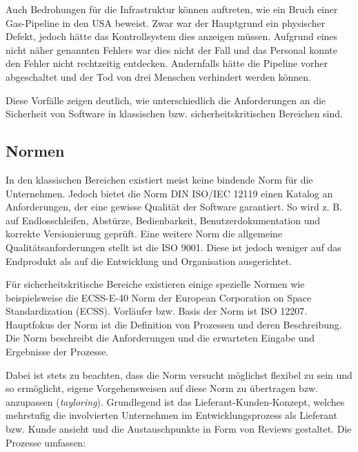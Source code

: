 Auch Bedrohungen für die Infrastruktur können auftreten, wie ein Bruch einer Gas-Pipeline in den USA beweist.
Zwar war der Hauptgrund ein physischer Defekt, jedoch hätte das Kontrollsystem dies anzeigen müssen.
Aufgrund eines nicht näher genannten Fehlers war dies nicht der Fall und das Personal konnte den Fehler nicht rechtzeitig entdecken.
Andernfalls hätte die Pipeline vorher abgeschaltet und der Tod von drei Menschen verhindert werden können.

Diese Vorfälle zeigen deutlich, wie unterschiedlich die Anforderungen an die Sicherheit von Software in klassischen bzw. sicherheitskritischen Bereichen sind.

\subsection{Normen} %

In den klassischen Bereichen existiert meist keine bindende Norm für die Unternehmen.
Jedoch bietet die Norm DIN ISO/IEC 12119 einen Katalog an Anforderungen, der eine gewisse Qualität der Software garantiert.
So wird z. B. auf Endlosschleifen, Abstürze, Bedienbarkeit, Benutzerdokumentation und korrekte Versionierung geprüft. 
Eine weitere Norm die allgemeine Qualitätsanforderungen stellt ist die ISO 9001.
Diese ist jedoch weniger auf das Endprodukt als auf die Entwicklung und Organisation ausgerichtet.
\parencite[Vgl.][S. 66 - 67]{Hohler:1998aa}


Für sicherheitskritische Bereiche existieren einige spezielle Normen wie beispielsweise die ECSS-E-40 Norm der European Corporation on Space Standardization (ECSS).
Vorläufer bzw. Basis der Norm ist ISO 12207.
Hauptfokus der Norm ist die Definition von Prozessen und deren Beschreibung. 
Die Norm beschreibt die Anforderungen und die erwarteten Eingabe und Ergebnisse der Prozesse.

Dabei ist stets zu beachten, dass die Norm versucht möglichst flexibel zu sein und so ermöglicht, eigene Vorgehensweisen auf diese Norm zu übertragen bzw. anzupassen (\emph{tayloring}).
Grundlegend ist das Lieferant-Kunden-Konzept, welches mehrstufig die involvierten Unternehmen im Entwicklungsprozess als Lieferant bzw. Kunde ansieht und die Austauschpunkte in Form von Reviews gestaltet.
Die Prozesse umfassen:

